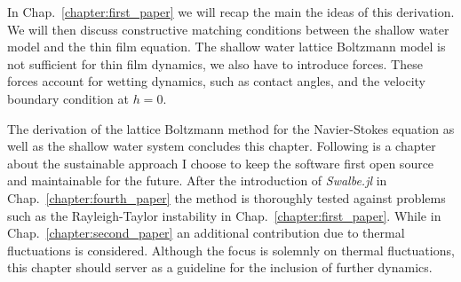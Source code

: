 In Chap.~\ref{chapter:first_paper} we will recap the main the ideas of this derivation. 
We will then discuss constructive matching conditions between the shallow water model and the thin film equation.
The shallow water lattice Boltzmann model is not sufficient for thin film dynamics, we also have to introduce forces. 
These forces account for wetting dynamics, such as contact angles, and the velocity boundary condition at $h = 0$.

The derivation of the lattice Boltzmann method for the Navier-Stokes equation as well as the shallow water system concludes this chapter.
Following is a chapter about the sustainable approach I choose to keep the software first open source and maintainable for the future.
After the introduction of \textit{Swalbe.jl} in Chap.~\ref{chapter:fourth_paper} the method is thoroughly tested against problems such as the Rayleigh-Taylor instability in Chap.~\ref{chapter:first_paper}.
While in Chap.~\ref{chapter:second_paper} an additional contribution due to thermal fluctuations is considered. 
Although the focus is solemnly on thermal fluctuations, this chapter should server as a guideline for the inclusion of further dynamics.